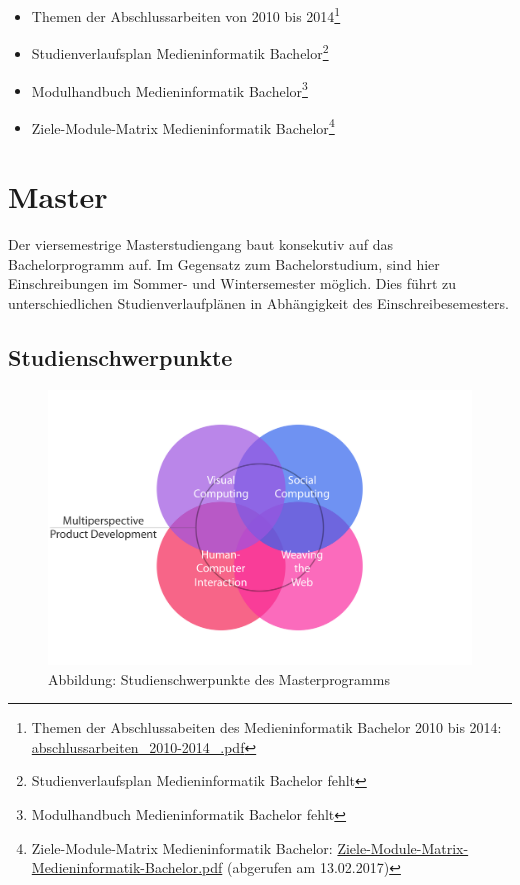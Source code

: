 \begin{itemize}
\tightlist
\item
  Themen der Abschlussarbeiten von 2010 bis 2014\footnote{Themen der
    Abschlussabeiten des Medieninformatik Bachelor 2010 bis 2014:
    \href{../anhaenge/abschlussarbeiten_2010-2014_.pdf}{abschlussarbeiten\_2010-2014\_.pdf}}
\item
  Studienverlaufsplan Medieninformatik Bachelor\footnote{Studienverlaufsplan
    Medieninformatik Bachelor fehlt}
\item
  Modulhandbuch Medieninformatik Bachelor\footnote{Modulhandbuch
    Medieninformatik Bachelor fehlt}
\item
  Ziele-Module-Matrix Medieninformatik Bachelor\footnote{Ziele-Module-Matrix
    Medieninformatik Bachelor:
    \href{../anhaenge/Ziele-Module-Matrix-Medieninformatik-Bachelor.pdf}{Ziele-Module-Matrix-Medieninformatik-Bachelor.pdf}
    (abgerufen am 13.02.2017)}
\end{itemize}

\section{Master}\label{master}

Der viersemestrige Masterstudiengang baut konsekutiv auf das
Bachelorprogramm auf. Im Gegensatz zum Bachelorstudium, sind hier
Einschreibungen im Sommer- und Wintersemester möglich. Dies führt zu
unterschiedlichen Studienverlaufplänen in Abhängigkeit des
Einschreibesemesters.

\subsection{Studienschwerpunkte}\label{studienschwerpunkte}

\begin{figure}[htbp]
\centering
\includegraphics[width=\columnwidth]{../anhaenge/bilder/ma-schwerpunkte.png}
\caption{Abbildung: Studienschwerpunkte des Masterprogramms}
\end{figure}

